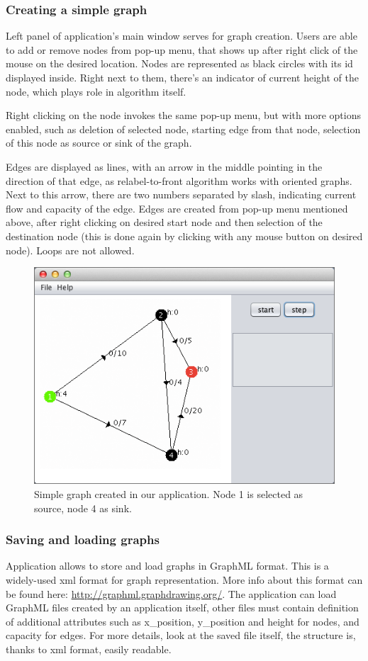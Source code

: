 \documentclass[a4paper,11pt]{article}
\begin{document}
\subsubsection*{Creating a simple graph}
Left panel of application's main window serves for graph creation. Users are able 
to add or remove nodes from pop-up menu, that shows up after right click of the 
mouse on the desired location. Nodes are represented as black circles with its 
id displayed inside. Right next to them, there's an indicator of current height 
of the node, which plays role in algorithm itself.

Right clicking on the node invokes the same pop-up menu, but with more options 
enabled, such as deletion of selected node, starting edge from that node, selection 
of this node as source or sink of the graph.

Edges are displayed as lines, with an arrow in the middle pointing in the 
direction of that edge, as relabel-to-front algorithm works with oriented graphs. 
Next to this arrow, there are two numbers separated by slash, indicating current 
flow and capacity of the edge. Edges are created from pop-up menu mentioned above, 
after right clicking on desired start node and then selection of the destination 
node (this is done again by clicking with any mouse button on desired node). 
Loops are not allowed.

\begin{figure}[H]
\centering
\includegraphics[width=12cm]{1.png}
\caption{Simple graph created in our application. Node 1 is selected as source, node 4 as sink.}
\label{pic1}
\end{figure}

\subsubsection*{Saving and loading graphs}
Application allows to store and load graphs in GraphML format. This is a widely-used 
xml format for graph representation. More info about this format can be found here: 
\url{http://graphml.graphdrawing.org/}. The application can load GraphML files created
by an application itself, other files must contain definition of additional attributes
such as x\_position, y\_position and height for nodes, and capacity for edges. For more
details, look at the saved file itself, the structure is, thanks to xml format, 
easily readable. 
\end{document}
